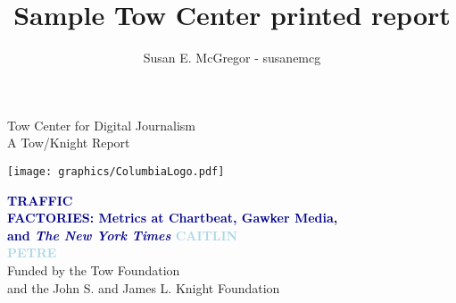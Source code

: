 \documentclass[symmetric, notoc, nobib]{towcenter-book}
\title{Sample Tow Center printed report}
\author{Susan E. McGregor - susanemcg}
\newcommand{\blankpage}{\newpage\hbox{}\thispagestyle{empty}\newpage}
\begin{document}
\frontmatter

\blankpage

\blankpage


\begin{minipage}[t][1\textheight]{0.40\textwidth}
\vspace{0pt}
\begin{flushleft}
\small\textsf{Tow Center for Digital Journalism\\
A Tow/Knight Report}
\end{flushleft}
\vfill
\texttt{[image: graphics/ColumbiaLogo.pdf]}
\end{minipage}%
\hfill
\begin{minipage}[t][1\textheight]{70mm}
\vspace{0pt}
\Huge\textcolor{darkblue}{\textbf{{\titlefont
TRAFFIC \\FACTORIES: 
Metrics at Chartbeat, Gawker Media,
\\and \textit{The New York Times}
\textcolor{lightblue}{
CAITLIN\\
PETRE\\
}
}
}}
\vfill
\small\textsf{Funded by the Tow Foundation\\
and the John S. and James L. Knight Foundation}
\end{minipage}%

\blankpage

\newpage
\null
\vfill
\end{document}
